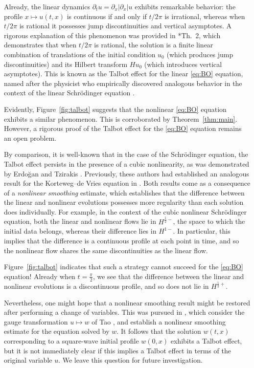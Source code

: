 \documentclass [11pt] {article}
\newcommand{\<}{\langle}
\renewcommand{\>}{\rangle}
\begin{document}
Already, the linear dynamics $\partial_t u = \partial_x |\partial_x| u$ exhibits remarkable behavior: the profile $x\mapsto u(t,x)$ is continuous if and only if $t/2\pi$ is irrational, whereas when $t/2\pi$ is rational it possesses jump discontinuities and vertical asymptotes.  A rigorous explanation of this phenomenon was provided in \cite{boulton2021new}*{Th.~2}, which demonstrates that when $t/2\pi$ is rational, the solution is a finite linear combination of translations of the initial condition $u_0$ (which produces jump discontinuities) and its Hilbert transform $Hu_0$ (which introduces vertical asymptotes).  This is known as the Talbot effect for the linear \eqref{eq:BO} equation, named after the physicist who empirically  discovered analogous behavior in the context of the linear Schr\"odinger equation \cite{Talbot}. 

Evidently, Figure~\ref{fig:talbot} suggests that the nonlinear \eqref{eq:BO} equation exhibits a similar phenomenon.  This is corroborated by Theorem~\ref{thm:main}.  
%
However, a rigorous proof of the Talbot effect for the \eqref{eq:BO} equation remains an open problem.  

By comparison, it is well-known that in the case of the Schr\"odinger equation, the Talbot effect persists in the presence of a cubic nonlinearity, as was demonstrated by Erdo{\u{g}}an and Tzirakis
\cite{erdogan2014talbot}. 
Previously, these authors had established an analogous result for the Korteweg--de Vries equation in \cite{erdogan2013}.  Both results come as a consequence of a \emph{nonlinear smoothing} estimate, which establishes that the difference between the linear and nonlinear evolutions possesses more regularity than each solution does individually.  For example, in the context of the cubic nonlinear Schr\"odinger equation, both the linear and nonlinear flows lie in $H^{\frac12 -}$, the space to which the initial data belongs, whereas their difference lies in $H^{1-}$.  In particular, this implies that the difference is a continuous profile at each point in time, and so the nonlinear flow shares the same discontinuities as the linear flow.



Figure~\ref{fig:talbot} indicates that such a strategy cannot succeed for the \eqref{eq:BO} equation!  Already when $t=\frac{\pi}{2}$, we see that the difference between the linear and nonlinear evolutions is a discontinuous profile, and so does not lie in $H^{\frac12 +}$.


Nevertheless, one might hope that a nonlinear smoothing result might be restored after performing a change of variables.  This was pursued in \cites{IMOS,PKT}, which consider the gauge transformation $u\mapsto w$ of Tao \cite{Tao}, and establish a nonlinear smoothing estimate for the equation solved by $w$.  It follows that the solution $w(t,x)$ corresponding to a square-wave initial profile $w(0,x)$ exhibits a Talbot effect, but it is not immediately clear if this implies a Talbot effect in terms of the original variable $u$. We leave this question for future investigation.
\end{document}
